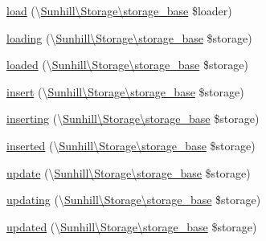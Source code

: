 \begin{DoxyCompactItemize}
\item 
\hyperlink{classSunhill_1_1Properties_1_1oo__property_a58fdf3b85b14a1ff2c5347c9d9b5fa71}{load} (\textbackslash{}\hyperlink{classSunhill_1_1Storage_1_1storage__base}{Sunhill\textbackslash{}\+Storage\textbackslash{}storage\+\_\+base} \$loader)
\item 
\hyperlink{classSunhill_1_1Properties_1_1oo__property_adeb90c421aeca9cf753192fcabc1cc04}{loading} (\textbackslash{}\hyperlink{classSunhill_1_1Storage_1_1storage__base}{Sunhill\textbackslash{}\+Storage\textbackslash{}storage\+\_\+base} \$storage)
\item 
\hyperlink{classSunhill_1_1Properties_1_1oo__property_a97c652f03a3fc8a770e7ac0f135f112e}{loaded} (\textbackslash{}\hyperlink{classSunhill_1_1Storage_1_1storage__base}{Sunhill\textbackslash{}\+Storage\textbackslash{}storage\+\_\+base} \$storage)
\item 
\hyperlink{classSunhill_1_1Properties_1_1oo__property_acca4c814d5066bd0906952090dd0cfa8}{insert} (\textbackslash{}\hyperlink{classSunhill_1_1Storage_1_1storage__base}{Sunhill\textbackslash{}\+Storage\textbackslash{}storage\+\_\+base} \$storage)
\item 
\hyperlink{classSunhill_1_1Properties_1_1oo__property_a67f13a47883c6503973a869ea42b7081}{inserting} (\textbackslash{}\hyperlink{classSunhill_1_1Storage_1_1storage__base}{Sunhill\textbackslash{}\+Storage\textbackslash{}storage\+\_\+base} \$storage)
\item 
\hyperlink{classSunhill_1_1Properties_1_1oo__property_ade3733dec92e3172e02c930d62f74a8a}{inserted} (\textbackslash{}\hyperlink{classSunhill_1_1Storage_1_1storage__base}{Sunhill\textbackslash{}\+Storage\textbackslash{}storage\+\_\+base} \$storage)
\item 
\hyperlink{classSunhill_1_1Properties_1_1oo__property_a62efc8b5922945cfc7295976627d23aa}{update} (\textbackslash{}\hyperlink{classSunhill_1_1Storage_1_1storage__base}{Sunhill\textbackslash{}\+Storage\textbackslash{}storage\+\_\+base} \$storage)
\item 
\hyperlink{classSunhill_1_1Properties_1_1oo__property_a4e9144360e1f57e6d06c230469a9e039}{updating} (\textbackslash{}\hyperlink{classSunhill_1_1Storage_1_1storage__base}{Sunhill\textbackslash{}\+Storage\textbackslash{}storage\+\_\+base} \$storage)
\item 
\hyperlink{classSunhill_1_1Properties_1_1oo__property_a14db41b2602de335114dece328167ab8}{updated} (\textbackslash{}\hyperlink{classSunhill_1_1Storage_1_1storage__base}{Sunhill\textbackslash{}\+Storage\textbackslash{}storage\+\_\+base} \$storage)

\end{DoxyCompactItemize}
